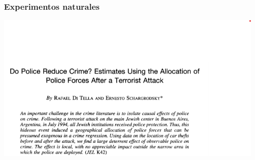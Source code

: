 \documentclass{beamer}
\begin{document}
\begin{frame} 
    \frametitle{Experimentos naturales}
    \begin{center}
        \includegraphics[scale=0.5]{../Figures/Do_Police_Induce_Crime.png}
    \end{center}
\end{frame}
\end{document}

